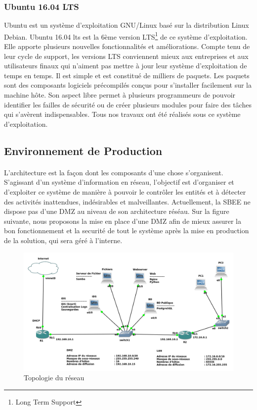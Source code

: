 	    
	  \subsubsection{Ubuntu 16.04 LTS}
	    Ubuntu est un système d’exploitation GNU/Linux basé sur la distribution Linux Debian. Ubuntu 16.04 \gls{lts} est la 6ème version LTS\footnote{Long Term Support} de ce système d'exploitation. Elle apporte plusieurs nouvelles fonctionnalités et améliorations. Compte tenu de leur cycle de support, les versions LTS conviennent mieux aux entreprises et aux utilisateurs finaux qui n'aiment pas mettre à jour leur système d'exploitation de temps en temps. Il est simple et est constitué de milliers de paquets. Les paquets sont des composants logiciels précompilés conçus pour s'installer facilement sur la machine hôte. Son aspect libre permet à plusieurs programmeurs de pouvoir identifier les failles de sécurité ou de créer plusieurs modules pour faire des tâches qui s'avèrent indispensables. Tous nos travaux ont \'et\'e r\'ealis\'es sous ce syst\`eme d'exploitation.
	    

      \subsection{Environnement de Production}
	\paragraph{}
	  L’architecture est la façon dont les composants d'une chose s’organisent. S’agissant d’un système d'information en réseau, l'objectif est d'organiser et d'exploiter ce système de manière à pouvoir le contrôler les entit\'es et à détecter des activités inattendues, indésirables et malveillantes. 
	  Actuellement, la SBEE ne dispose pas d'une DMZ au niveau de son architecture r\'es\'eau. Sur la figure suivante, nous proposons la mise en place d'une DMZ afin de mieux assurer la bon fonctionnement et la securit\'e de tout le syst\`eme apr\`es la mise en production de la solution, qui sera g\'er\'e \`a l'interne.

	  \begin{figure}[H]
	    \begin{center}
	      \includegraphics[scale=0.55]{images/mynetwork.png}
	    \end{center}
	    \caption[Topologie du r\'eseau]{Topologie du r\'eseau\footnotemark}
	    \label{mynetwork}
	  \end{figure}
	  
